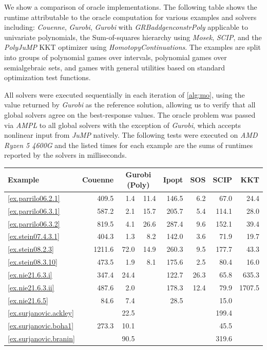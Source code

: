 We show a comparison of oracle implementations. The following table shows the runtime attributable to the oracle computation for various examples and solvers including: \emph{Couenne}, \emph{Gurobi}, \emph{Gurobi} with \emph{GRBaddgenconstrPoly} applicable to univariate polynomials, the Sum-of-squares hierarchy using \emph{Mosek}, \emph{SCIP}, and the \emph{PolyJuMP} KKT optimizer using \emph{HomotopyContinuations}. The examples are split into groups of polynomial games over intervals, polynomial games over semialgebraic sets, and games with general utilities based on standard optimization test functions.

All solvers were executed sequentially in each iteration of \ref{alg:mo}, using the value returned by \emph{Gurobi} as the reference solution, allowing us to verify that all global solvers agree on the best-response values. The oracle problem was passed via \emph{AMPL} to all global solvers with the exception of \emph{Gurobi}, which accepts nonlinear input from \emph{JuMP} natively. The following tests were executed on \emph{AMD Ryzen 5 4600G} and the listed times for each example are the sums of runtimes reported by the solvers in milliseconds.
\begin{center}
    \begin{tabular}{l||rrrrrrr}
        Example & Couenne & \multicolumn{2}{c}{Gurobi (Poly)} & Ipopt & SOS & SCIP & KKT \\
        \hline
        \ref{ex.parrilo06.2.1}     &  409.5 &  1.4 & 11.4 & 146.5 &   6.2 &  67.0 &   24.4 \\
        \ref{ex.parrilo06.3.1}     &  587.2 &  2.1 & 15.7 & 205.7 &   5.4 & 114.1 &   28.0 \\
        \ref{ex.parrilo06.3.2}     &  819.5 &  4.1 & 26.6 & 287.4 &   9.6 & 152.1 &   39.4 \\
        \ref{ex.stein07.4.3.1}     &  404.3 &  1.3 &  8.2 & 142.0 &   3.6 &  71.9 &   19.7 \\
        \ref{ex.stein08.2.3}       & 1211.6 & 72.0 & 14.9 & 260.3 &   9.5 & 177.7 &   43.3 \\
        \ref{ex.stein08.3.10}      &  473.5 &  1.9 &  8.1 & 175.6 &   2.5 &  80.4 &   16.0 \\
        \hline
        \ref{ex.nie21.6.3.i}       &  347.4 & 24.4 &      & 122.7 &  26.3 &  65.8 &  635.3 \\
        \ref{ex.nie21.6.3.ii}      &  487.6 &  2.0 &      & 178.3 &  12.4 &  79.9 & 1707.5 \\
        \ref{ex.nie21.6.5}         &   84.6 &  7.4 &      &  28.5 &       &  15.0 &        \\
        \hline
        \ref{ex.surjanovic.ackley} &        & 22.5 &      &       &       & 199.4 &        \\
        \ref{ex.surjanovic.boha1}  &  273.3 & 10.1 &      &       &       &  45.5 &        \\
        \ref{ex.surjanovic.branin} &        & 90.5 &      &       &       & 319.6 &        \\
    \end{tabular}
\end{center}

